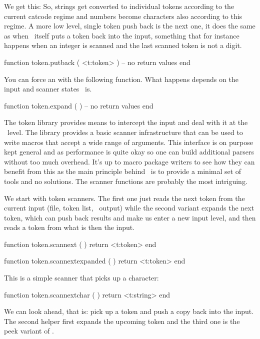 \typebuffer

We get this: \blank {\tt \inlinebuffer} \blank So, strings get converted to
individual tokens according to the current catcode regime and numbers become
characters also according to this regime. A more low level, single token push
back is the next one, it does the same as when \TEX\ itself puts a token back into
the input, something that for instance happens when an integer is scanned and the
last scanned token is not a digit.

\starttyping[option=LUA]
function token.putback ( <t:token> )
    -- no return values
end
\stoptyping

You can force an  with the following function. What happens
depends on the input and scanner states \TEX\ is.

\starttyping[option=LUA]
function token.expand ( )
    -- no return values
end
\stoptyping

\stopsubsection

\startsubsection[title={Scanning}]

The token library provides means to intercept the input and deal with it at the
\LUA\ level. The library provides a basic scanner infrastructure that can be used
to write macros that accept a wide range of arguments. This interface is on
purpose kept general and as performance is quite okay so one can build additional
parsers without too much overhead. It's up to macro package writers to see how
they can benefit from this as the main principle behind \LUAMETATEX\ is to
provide a minimal set of tools and no solutions. The scanner functions are
probably the most intriguing.

We start with token scanners. The first one just reads the next token from the
current input (file, token list, \LUA\ output) while the second variant expands
the next token, which can push back results and make us enter a new input level,
and then reads a token from what is then the input.

\starttyping[option=LUA]
function token.scannext ( )
    return <t:token>
end

function token.scannextexpanded ( )
    return <t:token>
end
\stoptyping

This is a simple scanner that picks up a character:

\starttyping[option=LUA]
function token.scannextchar ( )
    return <t:string>
end
\stoptyping

We can look ahead, that is: pick up a token and push a copy back into the input.
The second helper first expands the upcoming token and the third one is the peek
variant of .

